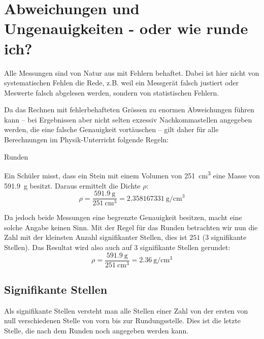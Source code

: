 \section{Abweichungen und Ungenauigkeiten - oder wie runde ich?} 
Alle Messungen sind von Natur aus mit Fehlern behaftet. Dabei ist hier nicht von systematischen Fehlen die Rede, z.B. weil ein Messgerät falsch justiert oder Meswerte falsch abgelesen werden, sondern von statistischen Fehlern.

Da das Rechnen mit fehlerbehafteten Grössen zu enormen Abweichungen führen kann – bei Ergebnissen aber nicht selten exzessiv Nachkommastellen angegeben werden, die eine falsche Genauigkeit vortäuschen – gilt daher für alle Berechnungen im Physik-Unterricht folgende Regeln: %
\begin{regel}
Runden
\vspace{6cm}
\end{regel}

\begin{example}
Ein Schüler misst, dass ein Stein mit einem Volumen von \SI{251}{\centi \metre \cubed} eine Masse von \SI{591.9}{\gram} besitzt. Daraus ermittelt die Dichte $\rho$:
\[ \rho = \frac{\SI{591.9}{\gram}}{\SI{251}{\centi \metre \cubed}} = \SI{2.358167331}{\gram \per \centi \metre \cubed} \]

Da jedoch beide Messungen eine begrenzte Genauigkeit besitzen, macht eine solche Angabe keinen Sinn. Mit der Regel für das Runden betrachten wir nun die Zahl mit der kleinsten Anzahl signifikanter Stellen, dies ist $251$ (3 signifikante Stellen). Das Resultat wird also auch auf 3 signifikante Stellen gerundet:
\[ \rho = \frac{\SI{591.9}{\gram}}{\SI{251}{\centi \metre \cubed}} = \SI{2.36}{\gram \per \centi \metre \cubed} \]
\end{example}

\subsection{Signifikante Stellen}
Als signifikante Stellen versteht man alle Stellen einer Zahl von der ersten von null verschiedenen Stelle von vorn bis zur Rundungsstelle. Dies ist die letzte Stelle, die nach dem Runden noch angegeben werden kann. 

